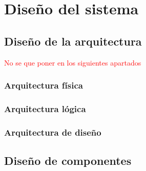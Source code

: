 \chapter{Diseño del sistema}
\section{Diseño de la arquitectura}
\textcolor{red}{No se que poner en los siguientes apartados}
\subsection{Arquitectura física}


\subsection{Arquitectura lógica}


\subsection{Arquitectura de diseño}


\section{Diseño de componentes}
